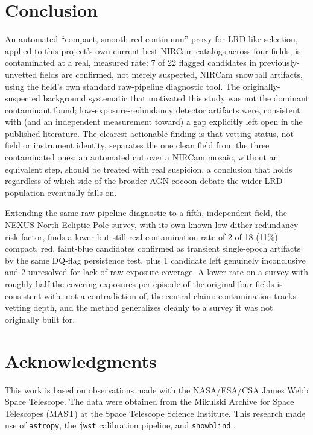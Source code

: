 \documentclass[11pt]{article}
\begin{document}
\section{Conclusion}

An automated ``compact, smooth red continuum'' proxy for LRD-like selection,
applied to this project's own current-best NIRCam catalogs across four fields,
is contaminated at a real, measured rate: 7 of 22 flagged candidates in
previously-unvetted fields are confirmed, not merely suspected, NIRCam snowball
artifacts, using the field's own standard raw-pipeline diagnostic tool. The
originally-suspected background systematic that motivated this study was not the
dominant contaminant found; low-exposure-redundancy detector artifacts were,
consistent with (and an independent measurement toward) a gap explicitly left
open in the published literature. The clearest actionable finding is that vetting
status, not field or instrument identity, separates the one clean field from the
three contaminated ones; an automated cut over a NIRCam mosaic, without an
equivalent step, should be treated with real suspicion, a conclusion that holds
regardless of which side of the broader AGN-cocoon debate the wider LRD
population eventually falls on.

Extending the same raw-pipeline diagnostic to a fifth, independent field, the
NEXUS North Ecliptic Pole survey, with its own known low-dither-redundancy
risk factor, finds a lower but still real contamination rate of 2 of 18 (11\%)
compact, red, faint-blue candidates confirmed as transient single-epoch
artifacts by the same DQ-flag persistence test, plus 1 candidate left
genuinely inconclusive and 2 unresolved for lack of raw-exposure coverage. A
lower rate on a survey with roughly half the covering exposures per episode
of the original four fields is consistent with, not a contradiction of, the
central claim: contamination tracks vetting depth, and the method generalizes
cleanly to a survey it was not originally built for.

\section*{Acknowledgments}

This work is based on observations made with the NASA/ESA/CSA James Webb Space
Telescope. The data were obtained from the Mikulski Archive for Space Telescopes
(MAST) at the Space Telescope Science Institute. This research made use of
\texttt{astropy}, the \texttt{jwst} calibration pipeline, and \texttt{snowblind}
\cite{Davies2024snowblind}.
\end{document}
